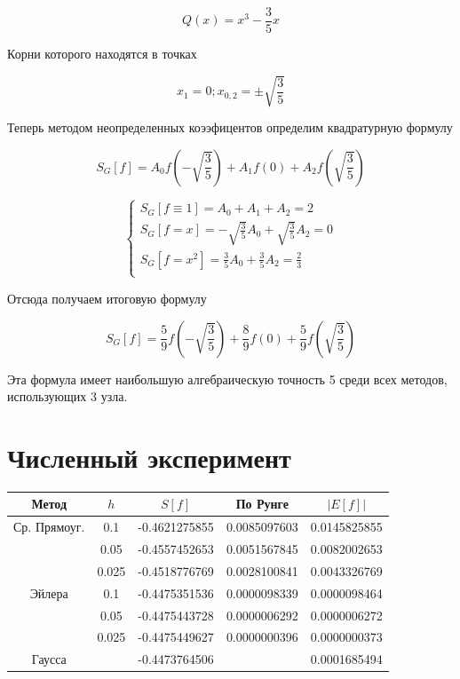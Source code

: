 \documentclass[11pt,a4paper,oneside]{article}
\begin{document}
$$ Q(x) = x^3 - \frac{3}{5} x $$

Корни которого находятся в точках

$$ x_1 = 0; x_{0, 2} = \pm \sqrt{\frac{3}{5}} $$

Теперь методом неопределенных коээфицентов определим квадратурную формулу

$$ S_G[f] = A_0 f \left( -\sqrt{\frac{3}{5}} \right) + A_1 f(0) + A_2 f \left(\sqrt{\frac{3}{5}} \right) $$


$$
\left\{ \begin{array}{l}
	S_G[f \equiv 1] = A_0 + A_1 + A_2 = 2 \\
	S_G[f = x] = -\sqrt{\frac{3}{5}} A_0 + \sqrt{\frac{3}{5}} A_2 = 0 \\
	S_G[f = x^2] = \frac{3}{5} A_0 + \frac{3}{5} A_2 = \frac{2}{3} \\
\end{array} \right.
$$

Отсюда получаем итоговую формулу

$$ S_G[f] = \frac{5}{9} f \left( -\sqrt{\frac{3}{5}} \right) + \frac{8}{9} f(0) + \frac{5}{9} f \left(\sqrt{\frac{3}{5}} \right) $$

Эта формула имеет наибольшую алгебраическую точность 5 среди всех методов, использующих 3 узла.

\section{Численный эксперимент}

\begin{tabular}{| c | c | c | c | c |}
	\hline
	Метод        & $h$   & $S[f]$        & По Рунге        & $| E[f] |$ \\ \hline \hline
	Ср. Прямоуг. & 0.1   & -0.4621275855 & 0.0085097603    & 0.0145825855 \\ \cline{2-5}
	             & 0.05  & -0.4557452653 & 0.0051567845    & 0.0082002653 \\ \cline{2-5}
                 & 0.025 & -0.4518776769 & 0.0028100841    & 0.0043326769 \\ \hline
    Эйлера       & 0.1   & -0.4475351536 & 0.0000098339    & 0.0000098464 \\ \cline{2-5}
                 & 0.05  & -0.4475443728 & 0.0000006292    & 0.0000006272 \\ \cline{2-5}
                 & 0.025 & -0.4475449627 & 0.0000000396    & 0.0000000373 \\ \hline
    Гаусса       &       & -0.4473764506 &                 & 0.0001685494 \\ \hline
\end{tabular}
\end{document}

